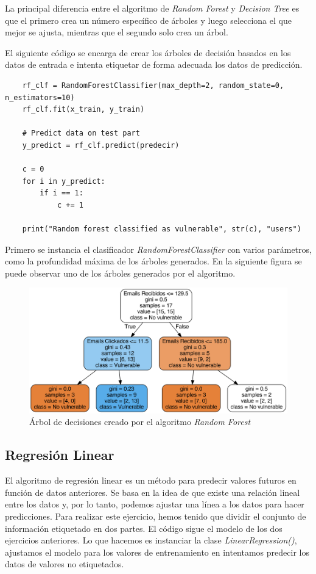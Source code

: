 \documentclass[12pt, a4paper,twoside,titlepage]{article}
\begin{document}
La principal diferencia entre el algoritmo de \emph{Random Forest} y \emph{Decision Tree} es que el primero crea un número específico de árboles y luego selecciona el que mejor se ajusta, mientras que el segundo solo crea un árbol.

El siguiente código se encarga de crear los árboles de decisión basados en los datos de entrada e intenta etiquetar de forma adecuada los datos de predicción.
\begin{verbatim}
    rf_clf = RandomForestClassifier(max_depth=2, random_state=0, n_estimators=10)
    rf_clf.fit(x_train, y_train)

    # Predict data on test part
    y_predict = rf_clf.predict(predecir)

    c = 0
    for i in y_predict:
        if i == 1:
            c += 1

    print("Random forest classified as vulnerable", str(c), "users")
\end{verbatim}

Primero se instancia el clasificador \emph{RandomForestClassifier} con varios parámetros, como la profundidad máxima de los árboles generados. En la siguiente figura se puede observar uno de los árboles generados por el algoritmo.

\begin{figure}[H]
    \centering
    \includegraphics[width=1\linewidth]{Figuras/tree0.png}
    \caption{Árbol de decisiones creado por el algoritmo \emph{Random Forest}}
    \label{fig:RandomForest}
\end{figure}


\subsection{Regresión Linear}
El algoritmo de regresión linear es un método para predecir valores futuros en función de datos anteriores. Se basa en la idea de que existe una relación lineal entre los datos y, por lo tanto, podemos ajustar una línea a los datos para hacer predicciones.
\newline
Para realizar este ejercicio, hemos tenido que dividir el conjunto de información etiquetado en dos partes. El código sigue el modelo de los dos ejercicios anteriores. Lo que hacemos es instanciar la clase \emph{LinearRegression()}, ajustamos el modelo para los valores de entrenamiento en intentamos predecir los datos de valores no etiquetados.
\end{document}
